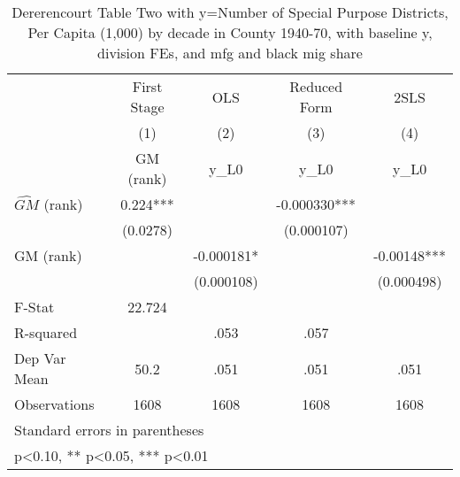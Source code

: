 \begin{table}[htbp]\centering
\def\sym#1{\ifmmode^{#1}\else\(^{#1}\)\fi}
\caption{Dererencourt Table Two with y=Number of Special Purpose Districts, Per Capita (1,000) by decade in County 1940-70, with baseline y, division FEs, and mfg and black mig share}
\begin{tabular}{l*{4}{c}}
\toprule
                    & First Stage   &         OLS   &Reduced Form   &        2SLS   \\
                    &\multicolumn{1}{c}{(1)}&\multicolumn{1}{c}{(2)}&\multicolumn{1}{c}{(3)}&\multicolumn{1}{c}{(4)}\\
                    &\multicolumn{1}{c}{GM  (rank)}&\multicolumn{1}{c}{y\_L0}&\multicolumn{1}{c}{y\_L0}&\multicolumn{1}{c}{y\_L0}\\
\midrule
$\hat{GM}$ (rank)   &       0.224***&               &   -0.000330***&               \\
                    &    (0.0278)   &               &  (0.000107)   &               \\
\addlinespace
GM  (rank)          &               &   -0.000181*  &               &    -0.00148***\\
                    &               &  (0.000108)   &               &  (0.000498)   \\
\midrule
F-Stat              &      22.724   &               &               &               \\
R-squared           &               &        .053   &        .057   &               \\
Dep Var Mean        &        50.2   &        .051   &        .051   &        .051   \\
Observations        &        1608   &        1608   &        1608   &        1608   \\
\bottomrule
\multicolumn{5}{l}{\footnotesize Standard errors in parentheses}\\
\multicolumn{5}{l}{\footnotesize * p<0.10, ** p<0.05, *** p<0.01}\\
\end{tabular}
\end{table}
